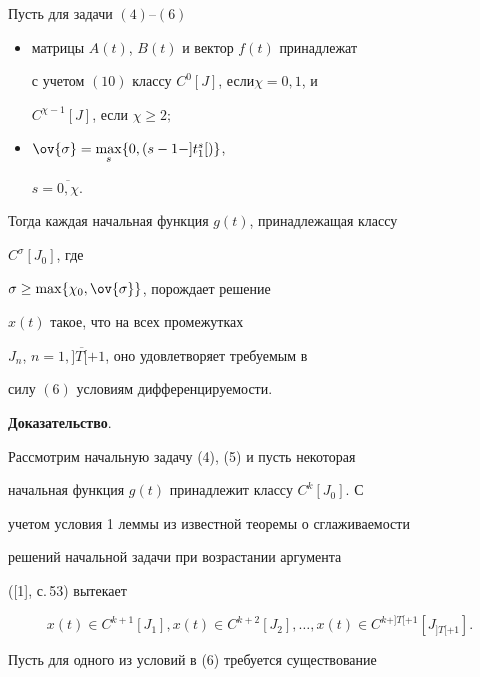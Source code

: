 \begin{lem}


Пусть для задачи $(4)$--$(6)$


\begin{itemize}


\item[1.] матрицы $A(t)$, $B(t)$ и вектор $f(t)$ принадлежат


с учетом $(10)$ классу $C^0[J]$, если\linebreak $\chi=0,1$, и


$C^{\chi-1}[J]$, если $\chi\geq 2;$


\item[2.] $ \ov{\sigma} =\max\limits_s\{0,(s-1-]t_1^s[)\}$,


$s=\overline{0,\chi}$.


\end{itemize}





Тогда каждая начальная функция $g(t)$, принадлежащая классу


$C^{\sigma}[J_0]$, где 


$\sigma \geq \max \{ \chi_0,\ov{\sigma}\}$, порождает решение


$x(t)$ такое, что на всех промежутках 


$J_n$, $n=\overline{1,]T[+1}$, оно удовлетворяет требуемым в 


силу $(6)$ условиям дифференцируемости.


\end{lem}





{\bf Доказательство}. 


Рассмотрим начальную задачу (4), (5) и пусть некоторая 


начальная функция $g(t)$ принадлежит классу $C^k[J_0]$. С


учетом условия 1 леммы из известной теоремы о сглаживаемости


решений начальной задачи при возрастании аргумента 


([1], с.\,53) вытекает


$$


x(t)\in C^{k+1}[J_1],x(t)\in C^{k+2}[J_2],\dotsc,


x(t)\in C^{k+]T[+1}[J_{]T[+1}].


$$


Пусть для одного из условий в (6) требуется существование


